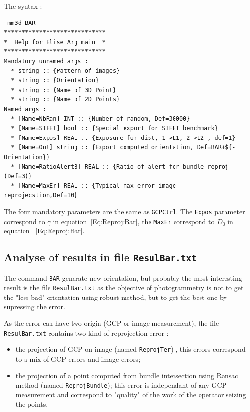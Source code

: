 The syntax :

\begin{verbatim}
 mm3d BAR 
*****************************
*  Help for Elise Arg main  *
*****************************
Mandatory unnamed args : 
  * string :: {Pattern of images}
  * string :: {Orientation}
  * string :: {Name of 3D Point}
  * string :: {Name of 2D Points}
Named args : 
  * [Name=NbRan] INT :: {Number of random, Def=30000}
  * [Name=SIFET] bool :: {Special export for SIFET benchmark}
  * [Name=Expos] REAL :: {Exposure for dist, 1->L1, 2->L2 , def=1}
  * [Name=Out] string :: {Export computed orientation, Def=BAR+${-Orientation}}
  * [Name=RatioAlertB] REAL :: {Ratio of alert for bundle reproj (Def=3)}
  * [Name=MaxEr] REAL :: {Typical max error image reprojecstion,Def=10}
\end{verbatim}


The four mandatory parameters are the same as {\tt GCPCtrl}. The {\tt Expos} parameter
correspond to $\gamma$ in equation~\ref{Eq:Reproj:Bar}, the {\tt MaxEr}
correspond to $D_0$ in equation ~\ref{Eq:Reproj:Bar}.

\subsection{Analyse of results in file {\tt ResulBar.txt}}

The command {\tt BAR} generate new orientation, but probably the most interesting result 
is the file {\tt ResulBar.txt} as  the objective of photogrammetry is not to get the "less bad" orientation 
using robust method, but to get the best one by supressing the error.

As the error can have two origin (GCP or image measurement), the file  {\tt ResulBar.txt} contains
two kind of reprojection error :

\begin{itemize}
   \item the projection of GCP on image (named {\tt ReprojTer}) , this errors correspond to a mix of
         GCP errors and  image errors;

   \item the projection of a point computed from bundle intersection using Ransac method (named {\tt ReprojBundle}); 
         this error is independant of any GCP measurement and correspond to "quality" of the work
          of the operator seizing the points.
\end{itemize}

